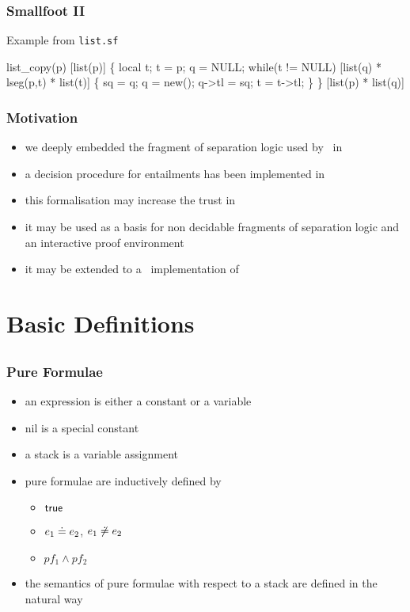 \begin{frame}[fragile]
\frametitle{Smallfoot II}

\begin{exampleblock}{Example from \texttt{list.sf}}
\begin{semiverbatim}
list_copy(p) [list(p)] \{
  local t;
  t = p;
  q = NULL;
  while(t != NULL) [list(q) * lseg(p,t) * list(t)] \{
    sq = q;
    q = new();
    q->tl = sq;
    t = t->tl;
  \}
\} [list(p) * list(q)]
\end{semiverbatim}
\end{exampleblock}
\end{frame}


\begin{frame}
\frametitle{Motivation}
\begin{itemize}
\item we deeply embedded the fragment of separation logic used by \smallfoot\
  in \HOL
\item a decision procedure for entailments has been implemented in \HOL
\item this formalisation may increase the trust in \smallfoot
\item it may be used as a basis for non decidable fragments of separation
  logic and an interactive proof environment
\item it may be extended to a \HOL\ implementation of \smallfoot
\end{itemize}
\end{frame}


\section{Basic Definitions}
\subsection*{}

\begin{frame}
\frametitle{Pure Formulae}
\begin{itemize}
\item an \alert{expression} is either a constant or a variable
\item \alert{nil} is a special constant
\item a \alert{stack} is a variable assignment
\item \alert{pure formulae} are inductively defined by
\begin{itemize}
\item ${\textsf{true}}$
\item $e_1 \doteq e_2$,  $e_1 \not\doteq e_2$
\item $pf_1 \wedge pf_2$
\end{itemize}
\item the semantics of pure formulae with respect to a stack are defined in
  the natural way
\end{itemize}
\end{frame}


